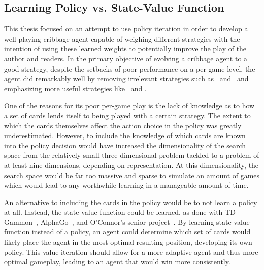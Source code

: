 
\subsection{Learning Policy vs. State-Value Function}
\label{sec:disc-value}

This thesis focused on an attempt to use policy iteration
in order to develop a well-playing
cribbage agent capable of weighing different strategies
with the intention of using these learned weights to 
potentially
improve the play of the author and readers.
%
In the primary objective of evolving a cribbage agent to a good strategy,
despite the setbacks of poor performance on a per-game level,
the agent did remarkably well
by removing irrelevant strategies
such as \handmaxmed\ and \peggingmaxmedgained\ 
and emphasizing more useful strategies
like \handmaxavg\ and \handmaxmin.

One of the reasons for its poor per-game play
is the lack of knowledge as to how a set of cards lends itself to being played
with a certain strategy.
%
The extent to which the cards themselves affect the action choice in the policy
was greatly underestimated.
%
However,
to include the knowledge of which cards are known into the policy decision
would have increased the dimensionality of the search space from the relatively
small three-dimensional problem tackled to a problem of at least nine
dimensions,
depending on representation.
%
At this dimensionality,
the search space would be far too massive and sparse to simulate an amount of
games which would lead to any worthwhile learning
in a manageable amount of time.

An alternative to including the cards in the policy would be to not learn a
policy at all.
%
Instead,
the state-value function could be learned,
as done with TD-Gammon~\cite{tdgammon},
AlphaGo~\cite{deepmind_alphago,deepmind_alphago_zero},
and O'Connor's senior project~\cite{roconnor_cs486}.
%
By learning state-value function instead of a policy,
an agent could determine which set of cards would likely place the agent in the
most optimal resulting position,
developing its own policy.
%
This value iteration should allow for a more adaptive agent and thus more
optimal gameplay,
leading to an agent that would win more consistently.

%
